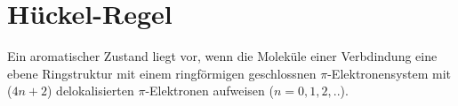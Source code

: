 \section{Hückel-Regel}
Ein aromatischer Zustand liegt vor, 
wenn die Moleküle einer Verbdindung eine ebene Ringstruktur mit einem ringförmigen geschlossnen 
$\pi$-Elektronensystem mit ($4n + 2$) delokalisierten $\pi$-Elektronen aufweisen 
($n = 0,1,2,..$).
